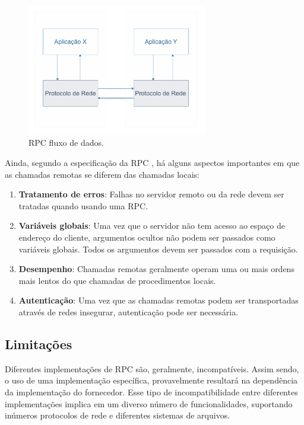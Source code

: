 \begin{figure}
\centering
\includegraphics[width=0.7\textwidth]{figuras/rpc.png}
\caption{RPC fluxo de dados.}
\label{fig:rpc}
\end{figure}

Ainda, segundo a especificação da RPC \cite{rfc1831:rpc}, há alguns aspectos importantes em que as chamadas remotas se diferem das chamadas locais:

\begin{enumerate}[label=\alph*)]
\item \textbf{Tratamento de erros}: Falhas no servidor remoto ou da rede devem ser tratadas quando usando uma RPC.

\item \textbf{Variáveis globais}: Uma vez que o servidor não tem acesso ao espaço de endereço do cliente, argumentos ocultos não podem ser passados como variáveis globais. Todos os argumentos devem ser passados com a requisição.

\item \textbf{Desempenho}: Chamadas remotas geralmente operam uma ou mais ordens mais lentos do que chamadas de procedimentos locais.

\item \textbf{Autenticação}: Uma vez que as chamadas remotas podem ser transportadas através de redes insegurar, autenticação pode ser necessária.

\end{enumerate}

\subsection{Limitações}

Diferentes implementações de RPC são, geralmente, incompatíveis. Assim sendo, o uso de uma implementação específica, provavelmente resultará na dependência da implementação do fornecedor. Esse tipo de incompatibilidade entre diferentes implementações implica em um diverso número de funcionalidades, suportando inúmeros protocolos de rede e diferentes sistemas de arquivos.

